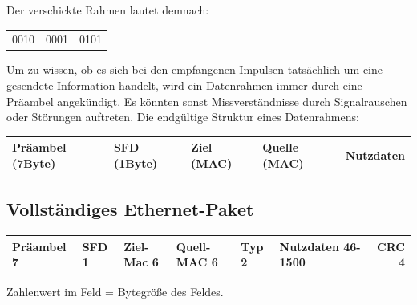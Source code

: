 \documentclass[12pt,a4paper]{article}
\begin{document}
			Der verschickte Rahmen lautet demnach:
			\begin{center}
				\begin{tabularx}{5cm}{XXX}
					0010&0001&0101\\
				\end{tabularx}
			\end{center}
			Um zu wissen, ob es sich bei den empfangenen Impulsen tatsächlich um eine gesendete Information handelt, wird ein Datenrahmen immer durch eine Präambel angekündigt. Es könnten sonst Missverständnisse durch Signalrauschen oder Störungen auftreten. Die endgültige Struktur eines Datenrahmens:
			\begin{center}
				\begin{tabularx}{17cm}{|l|l|X|X|X|}
					\hline
					Präambel (7Byte)&SFD (1Byte)&Ziel (MAC)&Quelle (MAC)&Nutzdaten\\
					\hline
				\end{tabularx}
			\end{center}
		   
		\subsection{Vollständiges Ethernet-Paket}
			\begin{center}
				\renewcommand{\arraystretch}{1.5}
				\begin{tabularx}{17cm}{|l|l|l|X|X|X|r|}
					\hline
					Präambel 7&SFD 1&Ziel-Mac 6&Quell-MAC 6&Typ 2&Nutzdaten 46-1500&CRC 4\\
					\hline
				\end{tabularx}
			\end{center}
			\begin{center}
				Zahlenwert im Feld = Bytegröße des Feldes.
			\end{center}
		
\end{document}
